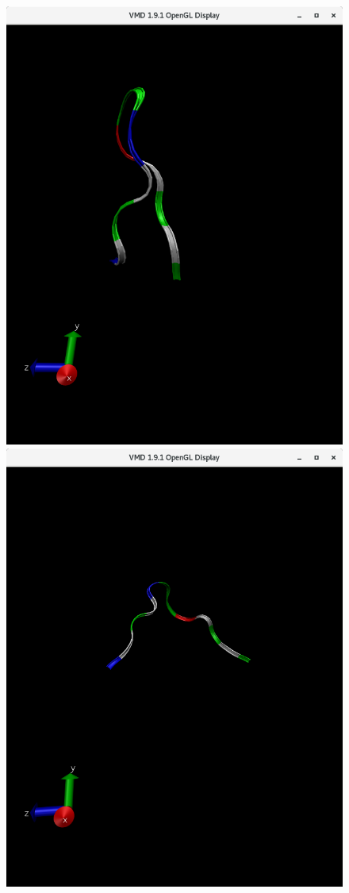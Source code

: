 \documentclass[12pt, onecolumn]{revtex4}    %
\begin{document}
\begin{figure}[h!]
\includegraphics[scale=0.2]{HairpinFirstRibbons}
\includegraphics[scale=0.2]{Hairpin10Ribbons}

\end{figure}
\end{document}
